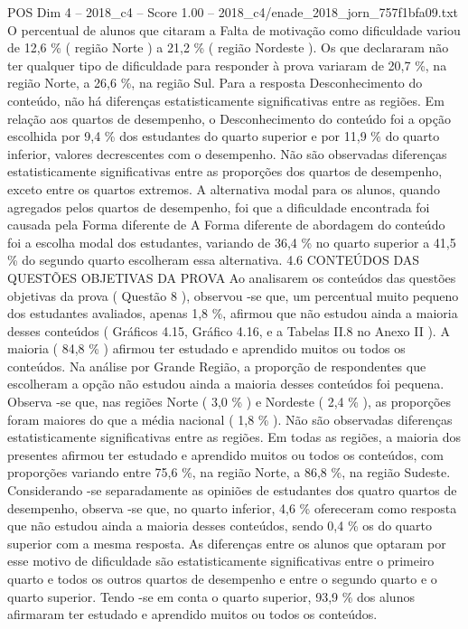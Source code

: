 \begin{textsample}{POS Dim 4 – 2018\_c4 – Score 1.00 – 2018\_c4/enade\_2018\_jorn\_757f1bfa09.txt}
O percentual de alunos que citaram a Falta de motivação como dificuldade variou de 12,6 \% ( região Norte ) a 21,2 \% ( região Nordeste ).
Os que declararam não ter qualquer tipo de dificuldade para responder à prova variaram de 20,7 \%, na região Norte, a 26,6 \%, na região Sul.
Para a resposta Desconhecimento do conteúdo, não há diferenças estatisticamente significativas entre as regiões.
Em relação aos quartos de desempenho, o Desconhecimento do conteúdo foi a opção escolhida por 9,4 \% dos estudantes do quarto superior e por 11,9 \% do quarto inferior, valores decrescentes com o desempenho.
Não são observadas diferenças estatisticamente significativas entre as proporções dos quartos de desempenho, exceto entre os quartos extremos.
A alternativa modal para os alunos, quando agregados pelos quartos de desempenho, foi que a dificuldade encontrada foi causada pela Forma diferente de A Forma diferente de abordagem do conteúdo foi a escolha modal dos estudantes, variando de 36,4 \% no quarto superior a 41,5 \% do segundo quarto escolheram essa alternativa. 4.6 CONTEÚDOS DAS QUESTÕES OBJETIVAS DA PROVA Ao analisarem os conteúdos das questões objetivas da prova ( Questão 8 ), observou -se que, um percentual muito pequeno dos estudantes avaliados, apenas 1,8 \%, afirmou que não estudou ainda a maioria desses conteúdos ( Gráficos 4.15, Gráfico 4.16, e a Tabelas II.8 no Anexo II ).
A maioria ( 84,8 \% ) afirmou ter estudado e aprendido muitos ou todos os conteúdos.
Na análise por Grande Região, a proporção de respondentes que escolheram a opção não estudou ainda a maioria desses conteúdos foi pequena.
Observa -se que, nas regiões Norte ( 3,0 \% ) e Nordeste ( 2,4 \% ), as proporções foram maiores do que a média nacional ( 1,8 \% ).
Não são observadas diferenças estatisticamente significativas entre as regiões.
Em todas as regiões, a maioria dos presentes afirmou ter estudado e aprendido muitos ou todos os conteúdos, com proporções variando entre 75,6 \%, na região Norte, a 86,8 \%, na região Sudeste.
Considerando -se separadamente as opiniões de estudantes dos quatro quartos de desempenho, observa -se que, no quarto inferior, 4,6 \% ofereceram como resposta que não estudou ainda a maioria desses conteúdos, sendo 0,4 \% os do quarto superior com a mesma resposta.
As diferenças entre os alunos que optaram por esse motivo de dificuldade são estatisticamente significativas entre o primeiro quarto e todos os outros quartos de desempenho e entre o segundo quarto e o quarto superior.
Tendo -se em conta o quarto superior, 93,9 \% dos alunos afirmaram ter estudado e aprendido muitos ou todos os conteúdos.

\end{textsample}
